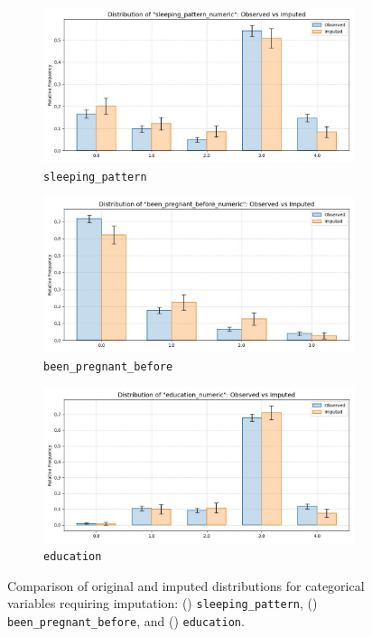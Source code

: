 \documentclass[11pt]{article}
\begin{document}
\begin{figure}[h]
  \centering
  \begin{subfigure}{0.45\textwidth}
    \includegraphics[width=\linewidth]{plots/mf_sleeping_pattern_numeric.jpg}
    \caption{\texttt{sleeping\_pattern}}
    \label{fig:mf_sleeping}
  \end{subfigure}
  \hfill
  \begin{subfigure}{0.45\textwidth}
    \includegraphics[width=\linewidth]{plots/mf_been_pregnant_before_numeric.jpg}
    \caption{\texttt{been\_pregnant\_before}}
    \label{fig:mf_preg_before}
  \end{subfigure}
  \hfill
  \begin{subfigure}{0.45\textwidth}
    \includegraphics[width=\linewidth]{plots/mf_education_numeric.jpg}
    \caption{\texttt{education}}
    \label{fig:mf_education}
  \end{subfigure}
  \caption{
    Comparison of original and imputed distributions for categorical variables requiring imputation: 
    () \texttt{sleeping\_pattern}, 
    () \texttt{been\_pregnant\_before}, and 
    () \texttt{education}.
  }
  \label{fig:mf_categorical}
\end{figure}
\end{document}
